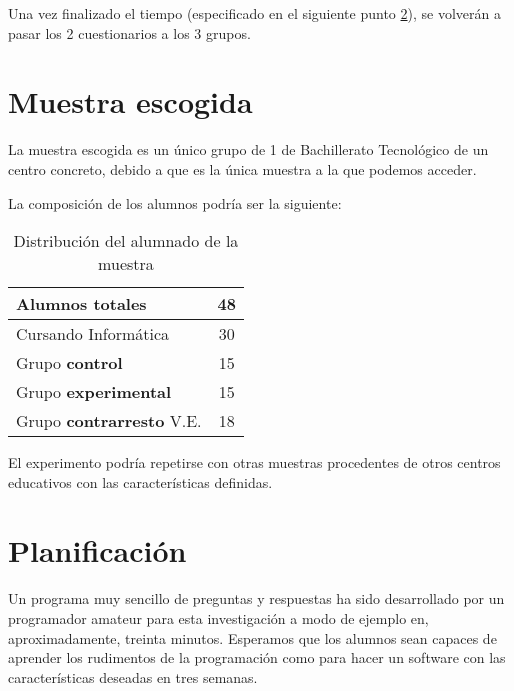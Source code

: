 \documentclass[palatino,miniheader]{apuntesURJC}
\begin{document}
Una vez finalizado el tiempo (especificado en el siguiente punto \ref{tiempos}), se volverán a pasar los 2 cuestionarios a los 3 grupos.

\section{Muestra escogida}

La muestra escogida es un único grupo de 1 de Bachillerato Tecnológico de un centro concreto, debido a que es la única muestra a la que podemos acceder.

La composición de los alumnos podría ser la siguiente:

\begin{table}[hbtp]
\centering
\begin{tabular}{|l|c|}
\hline
Alumnos \textbf{totales} & 48\\\hline
Cursando Informática & 30 \\\hline\hline
Grupo \textbf{control} & 15 \\
Grupo \textbf{experimental} & 15 \\
Grupo \textbf{contrarresto} V.E. & 18 \\\hline
\end{tabular}
\caption{Distribución del alumnado de la muestra}
\end{table}

El experimento podría repetirse con otras muestras procedentes de otros centros educativos con las características definidas.


\section{Planificación}
\label{tiempos}
Un programa muy sencillo de preguntas y respuestas ha sido desarrollado por un programador amateur para esta investigación a modo de ejemplo en, aproximadamente, treinta minutos.
%
Esperamos que los alumnos sean capaces de aprender los rudimentos de la programación como para hacer un software con las características deseadas en tres semanas.
\end{document}
